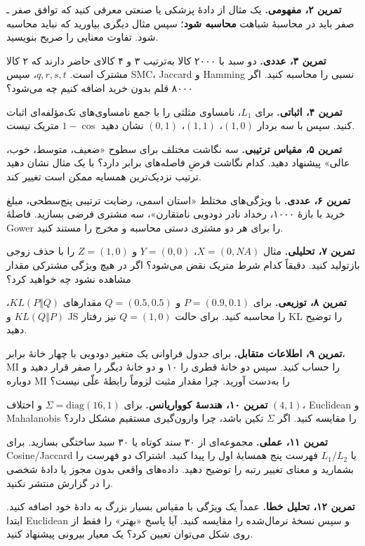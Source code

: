\documentclass[12pt,a4paper,oneside]{book}
\begin{document}
\textbf{تمرین ۲، مفهومی.} یک مثال از دادهٔ پزشکی یا صنعتی معرفی کنید که توافق صفر ـ صفر باید در محاسبهٔ شباهت \textbf{محاسبه شود}؛ سپس مثال دیگری بیاورید که نباید محاسبه شود. تفاوت معنایی را صریح بنویسید.

\textbf{تمرین ۳، عددی.} دو سبد با ۲۰۰۰ کالا به‌ترتیب ۳ و ۴ کالای حاضر دارند که ۲ کالا مشترک است. \(q,r,s,t\)، سپس SMC، Jaccard و Hamming نسبی را محاسبه کنید. اگر ۸۰۰۰ قلم بدون خرید اضافه کنیم چه می‌شود؟

\textbf{تمرین ۴، اثباتی.} برای \(L_1\)، نامساوی مثلثی را با جمع نامساوی‌های تک‌مؤلفه‌ای اثبات کنید. سپس با سه بردار \((1,0)\)، \((1,1)\)، \((0,1)\) نشان دهید \(1-\cos\) متریک نیست.

\textbf{تمرین ۵، مقیاس ترتیبی.} سه نگاشت مختلف برای سطوح «ضعیف، متوسط، خوب، عالی» پیشنهاد دهید. کدام نگاشت فرضِ فاصله‌های برابر دارد؟ با یک مثال نشان دهید ترتیب نزدیک‌ترین همسایه ممکن است تغییر کند.

\textbf{تمرین ۶، عددی.} با ویژگی‌های مختلط «استان اسمی، رضایت ترتیبی پنج‌سطحی، مبلغ خرید با بازهٔ ۱۰۰۰، رخداد نادر دودویی نامتقارن»، سه مشتری فرضی بسازید. فاصلهٔ Gower را برای هر دو مشتری دستی محاسبه و مخرج را مستند کنید.

\textbf{تمرین ۷، تحلیلی.} مثال \(X=(0,NA)\)، \(Y=(0,0)\) و \(Z=(1,0)\) را با حذف زوجی بازتولید کنید. دقیقاً کدام شرط متریک نقض می‌شود؟ اگر در هیچ ویژگی مشترکی مقدار مشاهده نشود چه خواهید کرد؟

\textbf{تمرین ۸، توزیعی.} برای \(P=(0.9,0.1)\) و \(Q=(0.5,0.5)\) مقدارهای \(KL(P\Vert Q)\)، \(KL(Q\Vert P)\) و JS را محاسبه کنید. برای حالت \(Q=(1,0)\) نیز رفتار KL را توضیح دهید.

\textbf{تمرین ۹، اطلاعات متقابل.} برای جدول فراوانی یک متغیر دودویی با چهار خانهٔ برابر، MI را حساب کنید. سپس دو خانهٔ قطری را ۱۰ و دو خانهٔ دیگر را صفر قرار دهید و دوباره MI را به‌دست آورید. چرا مقدار مثبت لزوماً رابطهٔ علّی نیست؟

\textbf{تمرین ۱۰، هندسهٔ کوواریانس.} برای \(\Sigma=\mathrm{diag}(16,1)\) و اختلاف \((4,1)\)، Euclidean و Mahalanobis را مقایسه کنید. اگر \(\Sigma\) تکین باشد، چرا وارون‌گیری مستقیم مشکل دارد؟

\textbf{تمرین ۱۱، عملی.} مجموعه‌ای از ۳۰ سند کوتاه یا ۳۰ سبد ساختگی بسازید. برای Cosine/Jaccard یا \(L_1/L_2\) فهرست پنج همسایهٔ اول را پیدا کنید. اشتراک دو فهرست را بشمارید و معنای تغییر رتبه را توضیح دهید. داده‌های واقعی بدون مجوز یا دادهٔ شخصی را در گزارش منتشر نکنید.

\textbf{تمرین ۱۲، تحلیل خطا.} عمداً یک ویژگی با مقیاس بسیار بزرگ به دادهٔ خود اضافه کنید. ابتدا Euclidean و سپس نسخهٔ نرمال‌شده را مقایسه کنید. آیا پاسخ «بهتر» را فقط از روی شکل می‌توان تعیین کرد؟ یک معیار بیرونی پیشنهاد کنید.
\end{document}
